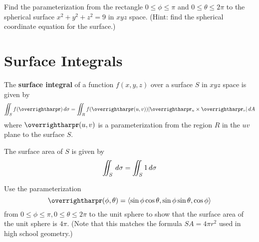 \documentclass[letterpaper, twoside, 12pt]{book}
\begin{document}
          \begin{contributors}

          \end{contributors}

          \begin{problem}
            Find the parameterization from the rectangle $0\leq\phi\leq\pi$
            and $0\leq\theta\leq2\pi$ to the spherical surface
            $x^2+y^2+z^2=9$ in $xyz$ space. (Hint: find the spherical
            coordinate equation for the surface.)
          \end{problem}

          \begin{solution}

          \end{solution}

          \begin{contributors}

          \end{contributors}


\section{Surface Integrals} %

\begin{definition}
  The \textbf{surface integral} of a function $f(x,y,z)$ over a surface
  $S$ in $xyz$ space is given by
  \[
    \iint_S f(\vect{r})\dvar{\sigma}
      =
    \iint_R f(\vect{r}(u,v))|\vect{r}_u\times\vect{r}_v|\dvar{A}
  \]
  where $\vect{r}(u,v)$ is a parameterization from the region $R$ in
  the $uv$ plane to the surface $S$.
\end{definition}

\begin{theorem}
  The surface area of $S$ is given by
  \[
    \iint_S \,d{\sigma} = \iint_S 1\,d{\sigma}
  \]
\end{theorem}

          \begin{problem}
            Use the parameterization
            \[
              \vect{r}(\phi,\theta)
                =
              \<
                \sin\phi\cos\theta,
                \sin\phi\sin\theta,
                \cos\phi
              \>
            \]
            from $0\leq\phi\leq\pi,0\leq\theta\leq2\pi$ to the unit
            sphere to show that the surface area of the unit sphere
            is $4\pi$. (Note that this matches the formula $SA=4\pi r^2$ used
            in high school geometry.)
          \end{problem}
\end{document}
